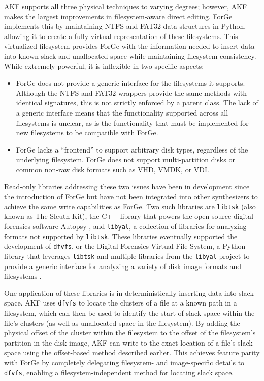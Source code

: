 \documentclass[preprint,12pt]{elsarticle}
\newcommand{\passthrough}[1]{#1}
\begin{document}
AKF supports all three physical techniques to varying degrees; however,
AKF makes the largest improvements in filesystem-aware direct editing.
ForGe \citep{vistiAutomaticCreationComputer2015} implements this by
maintaining NTFS and FAT32 data structures in Python, allowing it to
create a fully virtual representation of these filesystems. This
virtualized filesystem provides ForGe with the information needed to
insert data into known slack and unallocated space while maintaining
filesystem consistency. While extremely powerful, it is inflexible in
two specific aspects:

\begin{itemize}
\item
  ForGe does not provide a generic interface for the filesystems it
  supports. Although the NTFS and FAT32 wrappers provide the same
  methods with identical signatures, this is not strictly enforced by a
  parent class. The lack of a generic interface means that the
  functionality supported across all filesystems is unclear, as is the
  functionality that must be implemented for new filesystems to be
  compatible with ForGe.
\item
  ForGe lacks a ``frontend'' to support arbitrary disk types, regardless
  of the underlying filesystem. ForGe does not support multi-partition
  disks or common non-raw disk formats such as VHD, VMDK, or VDI.
\end{itemize}

Read-only libraries addressing these two issues have been in development
since the introduction of ForGe but have not been integrated into other
synthesizers to achieve the same write capabilities as ForGe. Two such
libraries are \passthrough{\lstinline!libtsk!} (also known as The Sleuth
Kit), the C++ library that powers the open-source digital forensics
software Autopsy \citep{SleuthkitSleuthkit2025}, and
\passthrough{\lstinline!libyal!}, a collection of libraries for
analyzing formats not supported by \passthrough{\lstinline!libtsk!}.
These libraries eventually supported the development of
\passthrough{\lstinline!dfvfs!}, or the Digital Forensics Virtual File
System, a Python library that leverages \passthrough{\lstinline!libtsk!}
and multiple libraries from the \passthrough{\lstinline!libyal!} project
to provide a generic interface for analyzing a variety of disk image
formats and filesystems \citep{Log2timelineDfvfs2025}.

One application of these libraries is in deterministically inserting
data into slack space. AKF uses \passthrough{\lstinline!dfvfs!} to
locate the clusters of a file at a known path in a filesystem, which can
then be used to identify the start of slack space within the file's
clusters (as well as unallocated space in the filesystem). By adding the
physical offset of the cluster within the filesystem to the offset of
the filesystem's partition in the disk image, AKF can write to the exact
location of a file's slack space using the offset-based method described
earlier. This achieves feature parity with ForGe by completely
delegating filesystem- and image-specific details to
\passthrough{\lstinline!dfvfs!}, enabling a filesystem-independent
method for locating slack space.
\end{document}
